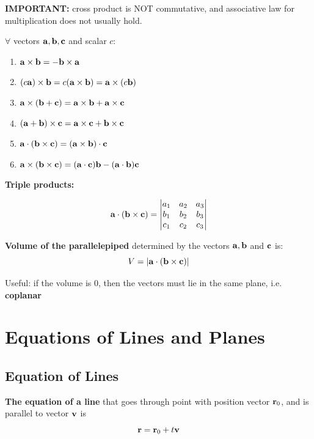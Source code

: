 \documentclass{report}
\begin{document}
\textbf{IMPORTANT:} cross product is NOT commutative, and associative law for multiplication does not usually hold.

\begin{tcolorbox}[colback=red!5!white, colframe=red!75!black, title=Properties of the Cross Product]
$\forall$ vectors $\mathbf{a}, \mathbf{b}, \mathbf{c}$ and scalar $c$:
\begin{enumerate}
    \item $\mathbf{a} \times \mathbf{b} = - \mathbf{b} \times \mathbf{a}$
    \item $(c \mathbf{a}) \times \mathbf{b} = c(\mathbf{a} \times \mathbf{b}) = \mathbf{a} \times (c \mathbf{b})$
    \item $\mathbf{a} \times (\mathbf{b} + \mathbf{c}) = \mathbf{a} \times \mathbf{b} + \mathbf{a} \times \mathbf{c}$
    \item $(\mathbf{a} + \mathbf{b}) \times \mathbf{c} = \mathbf{a} \times \mathbf{c} + \mathbf{b} \times \mathbf{c}$
    \item $\mathbf{a} \cdot (\mathbf{b} \times \mathbf{c}) = (\mathbf{a} \times \mathbf{b}) \cdot \mathbf{c}$
    \item $\mathbf{a} \times (\mathbf{b} \times \mathbf{c}) = (\mathbf{a} \cdot \mathbf{c}) \mathbf{b} - (\mathbf{a} \cdot \mathbf{b}) \mathbf{c}$
\end{enumerate}
\end{tcolorbox}

\textbf{Triple products:}

\[\mathbf{a} \cdot (\mathbf{b} \times \mathbf{c}) = \begin{vmatrix}
    a_1 & a_2 & a_3 \\
    b_1 & b_2 & b_3 \\
    c_1 & c_2 & c_3 \\
\end{vmatrix}\]


\textbf{Volume of the parallelepiped} determined by the vectors $\mathbf{a}, \mathbf{b}$ and $\mathbf{c}$
is:
\[V = |\mathbf{a} \cdot (\mathbf{b} \times \mathbf{c})|\]

Useful: if the volume is 0, then the vectors must lie in the same plane, i.e. \textbf{coplanar}

\section{Equations of Lines and Planes}

\subsection{Equation of Lines}

\textbf{The equation of a line} that goes through point with position vector $\mathbf{r}_0$, 
and is parallel to vector $\mathbf{v}$ is \[
\mathbf{r} = \mathbf{r}_0 + t \mathbf{v}
\]
\end{document}
